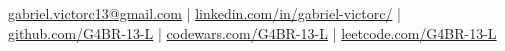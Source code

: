 
\begin{center}

  {\Large{}} \href{mailto:gabriel.victorc13@gmail.com}{gabriel.victorc13@gmail.com} |
  {\Large{}} \href{https://linkedin.com/in/gabriel-victorc/}{linkedin.com/in/gabriel-victorc/} | \\
  {\Large{}} \href{https://github.com/G4BR-13-L}{github.com/G4BR-13-L} |
  {\Large{}} \href{https://www.codewars.com/users/G4BR-%3E13-L}{codewars.com/G4BR-13-L} |
  {\Large{}} \href{https://leetcode.com/G4BR-13-L/}{leetcode.com/G4BR-13-L}

\end{center}